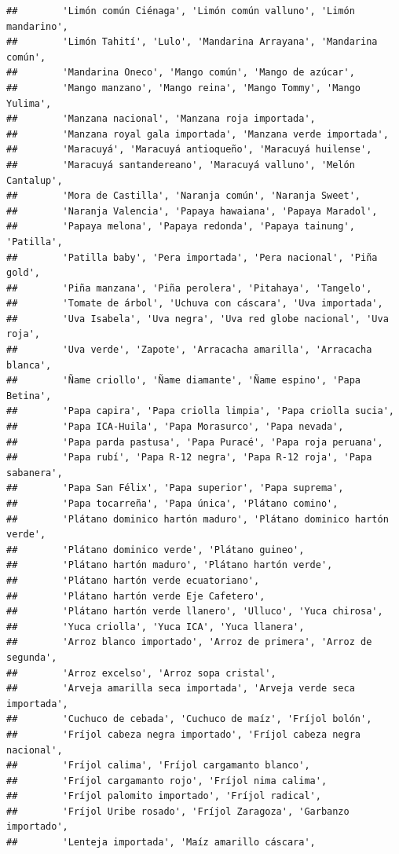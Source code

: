 \documentclass[
]{book}
\begin{document}
\begin{verbatim}
##        'Limón común Ciénaga', 'Limón común valluno', 'Limón mandarino',
##        'Limón Tahití', 'Lulo', 'Mandarina Arrayana', 'Mandarina común',
##        'Mandarina Oneco', 'Mango común', 'Mango de azúcar',
##        'Mango manzano', 'Mango reina', 'Mango Tommy', 'Mango Yulima',
##        'Manzana nacional', 'Manzana roja importada',
##        'Manzana royal gala importada', 'Manzana verde importada',
##        'Maracuyá', 'Maracuyá antioqueño', 'Maracuyá huilense',
##        'Maracuyá santandereano', 'Maracuyá valluno', 'Melón Cantalup',
##        'Mora de Castilla', 'Naranja común', 'Naranja Sweet',
##        'Naranja Valencia', 'Papaya hawaiana', 'Papaya Maradol',
##        'Papaya melona', 'Papaya redonda', 'Papaya tainung', 'Patilla',
##        'Patilla baby', 'Pera importada', 'Pera nacional', 'Piña gold',
##        'Piña manzana', 'Piña perolera', 'Pitahaya', 'Tangelo',
##        'Tomate de árbol', 'Uchuva con cáscara', 'Uva importada',
##        'Uva Isabela', 'Uva negra', 'Uva red globe nacional', 'Uva roja',
##        'Uva verde', 'Zapote', 'Arracacha amarilla', 'Arracacha blanca',
##        'Ñame criollo', 'Ñame diamante', 'Ñame espino', 'Papa Betina',
##        'Papa capira', 'Papa criolla limpia', 'Papa criolla sucia',
##        'Papa ICA-Huila', 'Papa Morasurco', 'Papa nevada',
##        'Papa parda pastusa', 'Papa Puracé', 'Papa roja peruana',
##        'Papa rubí', 'Papa R-12 negra', 'Papa R-12 roja', 'Papa sabanera',
##        'Papa San Félix', 'Papa superior', 'Papa suprema',
##        'Papa tocarreña', 'Papa única', 'Plátano comino',
##        'Plátano dominico hartón maduro', 'Plátano dominico hartón verde',
##        'Plátano dominico verde', 'Plátano guineo',
##        'Plátano hartón maduro', 'Plátano hartón verde',
##        'Plátano hartón verde ecuatoriano',
##        'Plátano hartón verde Eje Cafetero',
##        'Plátano hartón verde llanero', 'Ulluco', 'Yuca chirosa',
##        'Yuca criolla', 'Yuca ICA', 'Yuca llanera',
##        'Arroz blanco importado', 'Arroz de primera', 'Arroz de segunda',
##        'Arroz excelso', 'Arroz sopa cristal',
##        'Arveja amarilla seca importada', 'Arveja verde seca importada',
##        'Cuchuco de cebada', 'Cuchuco de maíz', 'Fríjol bolón',
##        'Fríjol cabeza negra importado', 'Fríjol cabeza negra nacional',
##        'Fríjol calima', 'Fríjol cargamanto blanco',
##        'Fríjol cargamanto rojo', 'Fríjol nima calima',
##        'Fríjol palomito importado', 'Fríjol radical',
##        'Fríjol Uribe rosado', 'Fríjol Zaragoza', 'Garbanzo importado',
##        'Lenteja importada', 'Maíz amarillo cáscara',

\end{verbatim}
\end{document}
